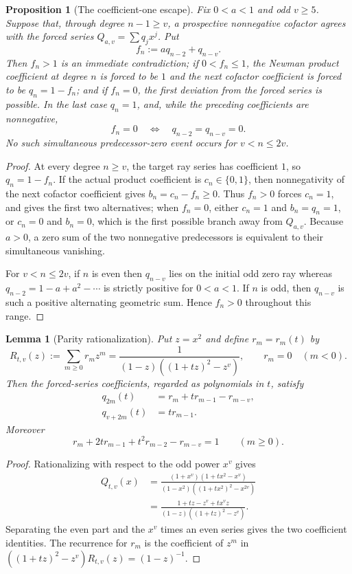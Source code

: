 \documentclass[11pt]{article}
\newtheorem{lemma}[theorem]{Lemma}
\newtheorem{proposition}[theorem]{Proposition}
\theoremstyle{remark}
\numberwithin{equation}{section}
\begin{document}
\begin{proposition}[The coefficient-one escape]\label{prop:oneescape}
Fix $0<a<1$ and odd $v\ge5$.  Suppose that, through degree $n-1\ge v$,
a prospective nonnegative cofactor agrees with the forced series
$Q_{a,v}=\sum q_jx^j$.  Put
\[
 f_n:=a q_{n-2}+q_{n-v}.
\]
Then $f_n>1$ is an immediate contradiction; if $0<f_n\le1$, the Newman
product coefficient at degree $n$ is forced to be $1$ and the next cofactor
coefficient is forced to be $q_n=1-f_n$; and if $f_n=0$, the first deviation
from the forced series is possible.  In the last case $q_n=1$, and, while the
preceding coefficients are nonnegative,
\[
 f_n=0\quad\Longleftrightarrow\quad q_{n-2}=q_{n-v}=0.
\]
No such simultaneous predecessor-zero event occurs for $v<n\le2v$.
\end{proposition}
\begin{proof}
At every degree $n\ge v$, the target ray series has coefficient $1$, so
$q_n=1-f_n$.  If the actual product coefficient is $c_n\in\{0,1\}$, then
nonnegativity of the next cofactor coefficient gives
$b_n=c_n-f_n\ge0$.  Thus $f_n>0$ forces $c_n=1$, and gives the first two
alternatives; when $f_n=0$, either $c_n=1$ and $b_n=q_n=1$, or $c_n=0$ and
$b_n=0$, which is the first possible branch away from $Q_{a,v}$.  Because
$a>0$, a zero sum of the two nonnegative predecessors is equivalent to their
simultaneous vanishing.

For $v<n\le2v$, if $n$ is even then $q_{n-v}$ lies on the initial odd zero
ray whereas $q_{n-2}=1-a+a^2-\cdots$ is strictly positive for $0<a<1$.
If $n$ is odd, then $q_{n-v}$ is such a positive alternating geometric sum.
Hence $f_n>0$ throughout this range.
\end{proof}

\begin{lemma}[Parity rationalization]\label{lem:parityrationalization}
Put $z=x^2$ and define $r_m=r_m(t)$ by
\[
 R_{t,v}(z):=\sum_{m\ge0}r_mz^m
 =\frac{1}{(1-z)((1+tz)^2-z^v)},
 \qquad r_m=0\quad(m<0).
\]
Then the forced-series coefficients, regarded as polynomials in $t$, satisfy
\begin{align*}
 q_{2m}(t)&=r_m+t r_{m-1}-r_{m-v},\\
 q_{v+2m}(t)&=t r_{m-1}.
\end{align*}
Moreover
\[
 r_m+2t r_{m-1}+t^2r_{m-2}-r_{m-v}=1
 \qquad(m\ge0).
\]
\end{lemma}
\begin{proof}
Rationalizing with respect to the odd power $x^v$ gives
\begin{align*}
 Q_{t,v}(x)
 &=\frac{(1+x^v)(1+tx^2-x^v)}
 {(1-x^2)((1+tx^2)^2-x^{2v})}\\
 &=\frac{1+tz-z^v+t x^v z}
 {(1-z)((1+tz)^2-z^v)}.
\end{align*}
Separating the even part and the $x^v$ times an even series gives the two
coefficient identities.  The recurrence for $r_m$ is the coefficient of
$z^m$ in
$((1+tz)^2-z^v)R_{t,v}(z)=(1-z)^{-1}$.
\end{proof}
\end{document}
